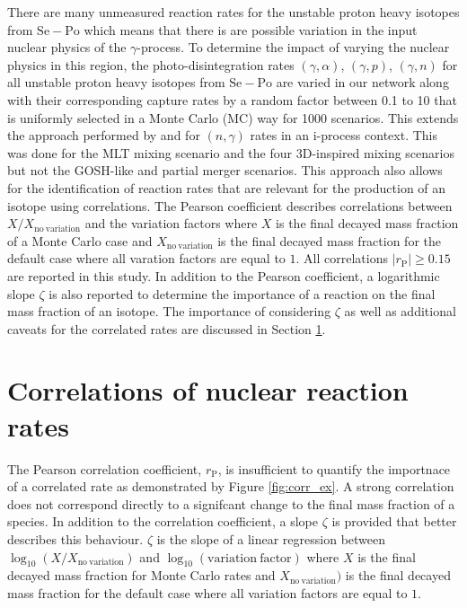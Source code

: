 There are many unmeasured reaction rates for the unstable proton heavy isotopes from $\mathrm{Se}-\mathrm{Po}$ which means that there is are possible variation in the input nuclear physics of the $\gamma$-process. 
To determine the impact of varying the nuclear physics in this region, the photo-disintegration rates $(\gamma, \alpha)$, $(\gamma, p)$, $(\gamma, n)$ for all unstable proton heavy isotopes from  $\mathrm{Se}-\mathrm{Po}$ are varied in our network along with their corresponding capture rates by a random factor between 0.1 to 10 that is uniformly selected in a Monte Carlo (MC) way for 1000 scenarios.
This extends the approach performed by \cite{denissenkovImpactReactionRate2018} and \cite{denissenkovImpactNgReaction2021} for $(n, \gamma)$ rates in an i-process context. 
This was done for the MLT mixing scenario and the four 3D-inspired mixing scenarios but not the GOSH-like and partial merger scenarios.
This approach also allows for the identification of reaction rates that are relevant for the production of an isotope using correlations.
The Pearson coefficient describes correlations between $X/X_{\mathrm{no~variation}}$ and the variation factors where $X$ is the final decayed mass fraction of a Monte Carlo case and $X_{\mathrm{no~variation}}$ is the final decayed mass fraction for the default case where all varation factors are equal to $1$.
All correlations $|r_\mathrm{P}| \geq 0.15$ are reported in this study.
In addition to the Pearson coefficient, a logarithmic slope $\zeta$ is also reported to determine the importance of a reaction on the final mass fraction of an isotope.
The importance of considering $\zeta$ as well as additional caveats for the correlated rates are discussed in Section \ref{sec:appendixNuclearRates}.

\section{Correlations of nuclear reaction rates}\label{sec:appendixNuclearRates}

The Pearson correlation coefficient, $r_\mathrm{P}$, is insufficient to quantify the importnace of a correlated rate as demonstrated by Figure \ref{fig:corr_ex}.
A strong correlation does not correspond directly to a signifcant change to the final mass fraction of a species.
In addition to the correlation coefficient, a slope $\zeta$ is provided that better describes this behaviour.
$\zeta$ is the slope of a linear regression between $\log_{10}(X/X_\mathrm{no~variation})$ and $\log_{10}(\mathrm{variation~factor})$ where $X$ is the final decayed mass fraction for Monte Carlo rates and $X_\mathrm{no~variation})$ is the final decayed mass fraction for the default case where all variation factors are equal to $1$.


